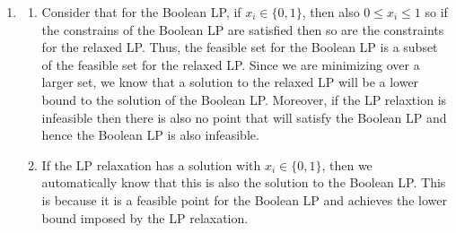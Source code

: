\documentclass[11pt]{amsart}
\begin{document}
\begin{enumerate}
\item \begin{enumerate}


\item Consider that for the Boolean LP, if $x_i \in \{0,1\}$, then also $0 \le x_i \le 1$ so if the constrains of the Boolean LP are satisfied then so are the constraints for the relaxed LP.  Thus, the feasible set for the Boolean LP is a subset of the feasible set for the relaxed LP.  Since we are minimizing over a larger set, we know that a solution to the relaxed LP will be a lower bound to the solution of the Boolean LP.  Moreover, if the LP relaxtion is infeasible then there is also no point that will satisfy the Boolean LP and hence the Boolean LP is also infeasible.


\item If the LP relaxation has a solution with $x_i \in \{0,1\}$, then we automatically know that this is also the solution to the Boolean LP.  This is because it is a feasible point for the Boolean LP and achieves the lower bound imposed by the LP relaxation. 






\end{enumerate}







\end{enumerate}
\end{document}
